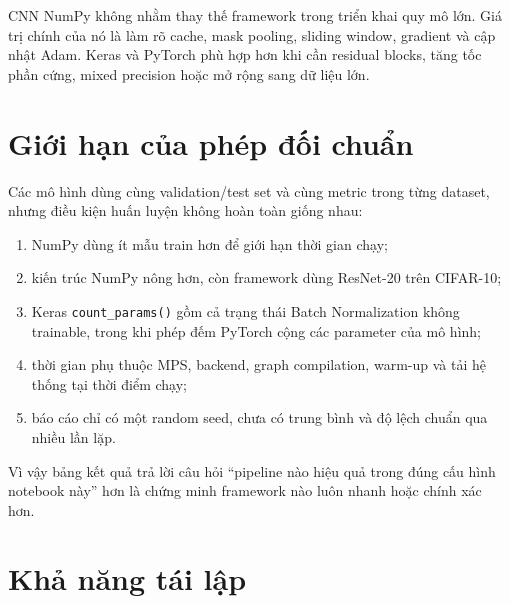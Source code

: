 \documentclass[12pt,a4paper]{report}
\begin{document}
CNN NumPy không nhằm thay thế framework trong triển khai quy mô lớn. Giá trị
chính của nó là làm rõ cache, mask pooling, sliding window, gradient và cập nhật
Adam. Keras và PyTorch phù hợp hơn khi cần residual blocks, tăng tốc phần cứng,
mixed precision hoặc mở rộng sang dữ liệu lớn.

\section{Giới hạn của phép đối chuẩn}
Các mô hình dùng cùng validation/test set và cùng metric trong từng dataset,
nhưng điều kiện huấn luyện không hoàn toàn giống nhau:
\begin{enumerate}
    \item NumPy dùng ít mẫu train hơn để giới hạn thời gian chạy;
    \item kiến trúc NumPy nông hơn, còn framework dùng ResNet-20 trên CIFAR-10;
    \item Keras \texttt{count\_params()} gồm cả trạng thái Batch Normalization
    không trainable, trong khi phép đếm PyTorch cộng các parameter của mô hình;
    \item thời gian phụ thuộc MPS, backend, graph compilation, warm-up và tải
    hệ thống tại thời điểm chạy;
    \item báo cáo chỉ có một random seed, chưa có trung bình và độ lệch chuẩn
    qua nhiều lần lặp.
\end{enumerate}
Vì vậy bảng kết quả trả lời câu hỏi ``pipeline nào hiệu quả trong đúng cấu hình
notebook này'' hơn là chứng minh framework nào luôn nhanh hoặc chính xác hơn.

\section{Khả năng tái lập}
\begin{table}[H]
\centering
\caption{Checklist tái lập Assignment 04}
\label{tab:reproducibility}
\end{table}
\end{document}
